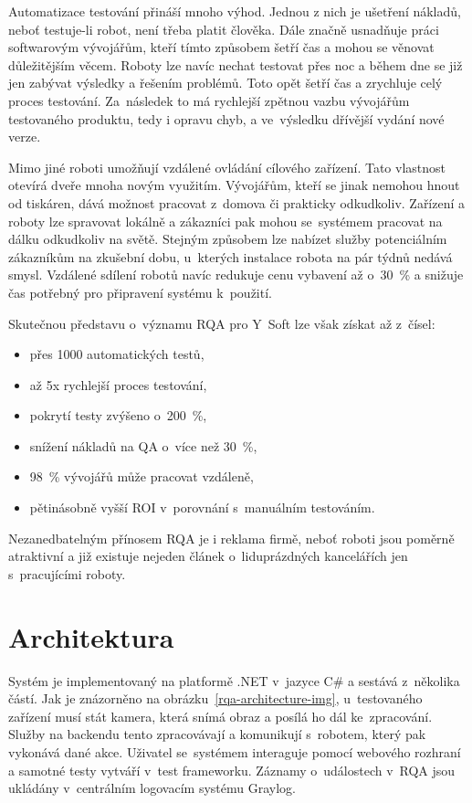 Automatizace testování přináší mnoho výhod. Jednou z nich je ušetření nákladů, neboť testuje-li robot, není třeba platit člověka. Dále značně usnadňuje práci softwarovým vývojářům, kteří tímto způsobem šetří čas a mohou se věnovat důležitějším věcem. Roboty lze navíc nechat testovat přes noc a během dne se již jen zabývat výsledky a řešením problémů. Toto opět šetří čas a zrychluje celý proces testování. Za~následek to má rychlejší zpětnou vazbu vývojářům testovaného produktu, tedy i opravu chyb, a ve~výsledku dřívější vydání nové verze.

Mimo jiné roboti umožňují vzdálené ovládání cílového zařízení. Tato vlastnost otevírá dveře mnoha novým využitím. Vývojářům, kteří se jinak nemohou hnout od tiskáren, dává možnost pracovat z~domova či prakticky odkudkoliv. Zařízení a roboty lze spravovat lokálně a zákazníci pak mohou se~systémem pracovat na dálku odkudkoliv na světě. Stejným způsobem lze nabízet služby potenciálním zákazníkům na zkušební dobu, u~kterých instalace robota na pár týdnů nedává smysl. Vzdálené sdílení robotů navíc redukuje cenu vybavení až o~30~\% a snižuje čas potřebný pro připravení systému k~použití.

Skutečnou představu o~významu RQA pro Y~Soft lze však získat až z~čísel:
\begin{itemize}
  \item přes 1000 automatických testů,
  \item až 5x rychlejší proces testování,
  \item pokrytí testy zvýšeno o~200~\%,
  \item snížení nákladů na QA o~více než 30~\%,
  \item 98~\% vývojářů může pracovat vzdáleně,
  \item pětinásobně vyšší ROI v~porovnání s~manuálním testováním.
\end{itemize}

Nezanedbatelným přínosem RQA je i reklama firmě, neboť roboti jsou poměrně atraktivní a již existuje nejeden článek o~liduprázdných kancelářích jen s~pracujícími roboty.

\section{Architektura}
Systém je implementovaný na platformě .NET v~jazyce C\# a sestává z~několika částí. Jak je znázorněno na obrázku~\ref{rqa-architecture-img}, u~testovaného zařízení musí stát kamera, která snímá obraz a posílá ho dál ke~zpracování. Služby na backendu tento zpracovávají a komunikují s~robotem, který pak vykonává dané akce. Uživatel se~systémem interaguje pomocí webového rozhraní a samotné testy vytváří v~test frameworku. Záznamy o~událostech v~RQA jsou ukládány v~centrálním logovacím systému Graylog.


